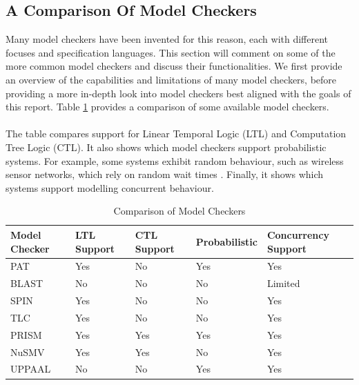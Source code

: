 \subsection{A Comparison Of Model Checkers}
Many model checkers have been invented for this reason, each with different focuses and specification languages. This section will comment on some of the more common model checkers and discuss their functionalities. We first provide an overview of the capabilities and limitations of many model checkers, before providing a more in-depth look into model checkers best aligned with the goals of this report. Table \ref{tab:model_checkers} provides a comparison of some available model checkers.
\\ \\
The table compares support for Linear Temporal Logic (LTL) and Computation Tree Logic (CTL). It also shows which model checkers support probabilistic systems. For example, some systems exhibit random behaviour, such as wireless sensor networks, which rely on random wait times \cite{bluetooth}. Finally, it shows which systems support modelling concurrent behaviour.
\begin{table}[H]
    \centering
    \begin{tabular}{|>{\raggedright\arraybackslash}p{3cm}|
        >{\centering\arraybackslash}p{2cm}|
        >{\centering\arraybackslash}p{2cm}|
        >{\centering\arraybackslash}p{3cm}|
        >{\centering\arraybackslash}p{3cm}|}
        \hline
        \textbf{Model Checker} & \textbf{LTL Support} & \textbf{CTL Support} & \textbf{Probabilistic} & \textbf{Concurrency Support} \\
        \hline
        PAT & Yes & No & Yes & Yes \\
        \hline
        BLAST & No & No & No & Limited \\
        \hline
        SPIN & Yes & No & No & Yes \\
        \hline
        TLC & Yes & No & No & Yes \\
        \hline
        PRISM & Yes & Yes & Yes & Yes \\
        \hline
        NuSMV & Yes & Yes & No & Yes \\
        \hline
        UPPAAL & No & No & Yes & Yes \\
        \hline
    \end{tabular}
    \caption{Comparison of Model Checkers}
    \label{tab:model_checkers}
    \end{table}
